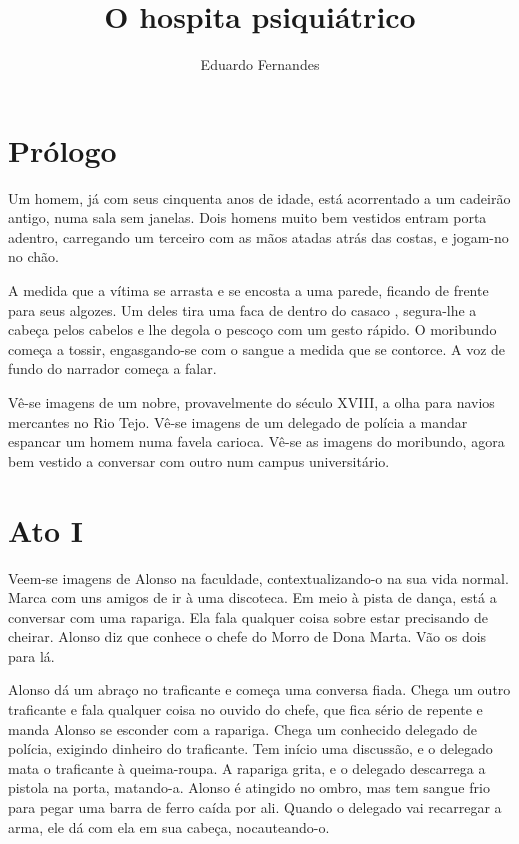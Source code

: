 \documentclass[a4paper,12pt]{character}
\title{O hospita psiquiátrico}
\author{Eduardo Fernandes}
\begin{document}
\maketitle

\section{Prólogo}

Um homem, já com seus cinquenta anos de idade, está acorrentado a um cadeirão antigo, numa sala sem janelas. Dois homens muito bem vestidos entram porta adentro, carregando um terceiro com as mãos atadas atrás das costas, e jogam-no no chão.

A medida que a vítima se arrasta e se encosta a uma parede, ficando de frente para seus algozes. Um deles tira uma faca de dentro do casaco , segura-lhe a cabeça pelos cabelos e lhe degola o pescoço com um gesto rápido. O moribundo começa a tossir, engasgando-se com o sangue a medida que se contorce. A voz de fundo do narrador começa a falar.

 Vê-se imagens de um nobre, provavelmente do século XVIII, a olha para navios mercantes no Rio Tejo.  Vê-se imagens de um delegado de polícia a mandar espancar um homem numa favela carioca.  Vê-se as imagens do moribundo, agora bem vestido a conversar com outro num campus universitário.

\section{Ato I}

Veem-se imagens de Alonso na faculdade, contextualizando-o na sua vida normal. Marca com uns amigos de ir à uma discoteca. Em meio à pista de dança, está a conversar com uma rapariga. Ela fala qualquer coisa sobre estar precisando de cheirar. Alonso diz que conhece o chefe do Morro de Dona Marta. Vão os dois para lá.

Alonso dá um abraço no traficante e começa uma conversa fiada. Chega um outro traficante e fala qualquer coisa no ouvido do chefe, que fica sério de repente e manda Alonso se esconder com a rapariga. Chega um conhecido delegado de polícia, exigindo dinheiro do traficante. Tem início uma discussão, e o delegado mata o traficante à queima-roupa. A rapariga grita, e o delegado descarrega a pistola na porta, matando-a. Alonso é atingido no ombro, mas tem sangue frio para pegar uma barra de ferro caída por ali. Quando o delegado vai recarregar a arma, ele dá com ela em sua cabeça, nocauteando-o.
\end{document}
